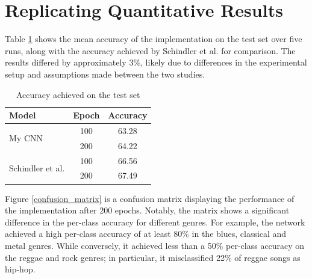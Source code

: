 \documentclass[conference]{IEEEtran}
\begin{document}
\section{Replicating Quantitative Results}

Table \ref{shallow_results} shows the mean accuracy of the implementation on the test set over five runs, along with the accuracy achieved by Schindler et al. \cite{SchindlerLidyRauber} for comparison.
The results differed by approximately 3\%, likely due to differences in the experimental setup and assumptions made between the two studies.

\begin{table}[htbp]
    \caption{Accuracy achieved on the test set}
    \begin{center}
    \begin{tabular}{l c c}
    \toprule
    \textbf{Model}&\textbf{Epoch}&\textbf{Accuracy}\\
    \midrule
    \multirow{ 2}{*}{My CNN} & 100 & 63.28 \\
    & 200 & 64.22 \\
    \midrule
    \multirow{ 2}{*}{Schindler et al.} & 100 & 66.56\\
    & 200 & 67.49 \\
    \bottomrule
    \end{tabular}
    \label{shallow_results}
    \end{center}
\end{table}

Figure \ref{confusion_matrix} is a confusion matrix displaying the performance of the implementation after 200 epochs.
Notably, the matrix shows a significant difference in the per-class accuracy for different genres.
For example, the network achieved a high per-class accuracy of at least 80\% in the blues, classical and metal genres.
While conversely, it achieved less than a 50\% per-class accuracy on the reggae and rock genres; in particular, it misclassified 22\% of reggae songs as hip-hop.
\end{document}
